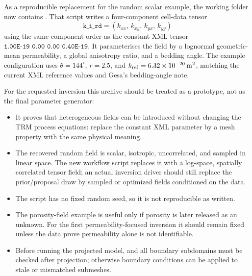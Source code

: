 As a reproducible replacement for the random scalar example, the working folder now
contains .
That script writes a four-component cell-data tensor
\[
\texttt{k\_i\_rd}=(k_{xx},\,k_{xy},\,k_{yx},\,k_{yy})
\]
using the same component order as the constant XML tensor
\(\texttt{1.00E-19 0.00 0.00 0.40E-19}\).  It parameterises the field by a
lognormal geometric-mean permeability, a global anisotropy ratio, and a bedding angle.
The example configuration uses \(\theta=144^\circ\), \(r=2.5\), and
\(k_{\rm ref}=6.32\times 10^{-20}\,\mathrm{m^2}\), matching the current XML reference
values and Gesa's bedding-angle note.

For the requested inversion this archive should be treated as a prototype, not as the
final parameter generator:

\begin{itemize}[leftmargin=1.5em]
  \item It proves that heterogeneous fields can be introduced without changing the TRM
  process equations: replace the constant XML parameter by a mesh property with the
  same physical meaning.
  \item The recovered random  field is scalar, isotropic, uncorrelated,
  and sampled in linear space.  The new workflow script replaces it with a log-space,
  spatially correlated tensor field; an actual inversion driver should still replace
  the prior/proposal draw by sampled or optimized fields conditioned on the data.
  \item The script has no fixed random seed, so it is not reproducible as written.
  \item The porosity-field example is useful only if porosity is later released as an
  unknown.  For the first permeability-focused inversion it should remain fixed unless
  the data prove permeability alone is not identifiable.
  \item Before running the projected model,  and all boundary
  subdomains must be checked after projection; otherwise boundary conditions can be
  applied to stale or mismatched submeshes.
\end{itemize}

